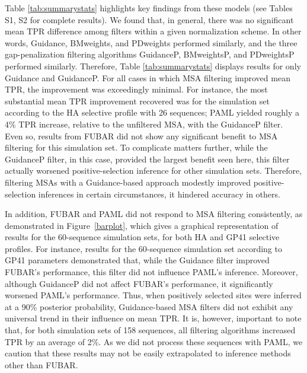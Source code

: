 \documentclass[11pt]{article}
\begin{document}
Table \ref{tab:summarystats} highlights key findings from these models (see Tables S1, S2 for complete results). We found that, in general, there was no significant mean TPR difference among filters within a given normalization scheme. In other words, Guidance, BMweights, and PDweights  performed similarly, and the three gap-penalization filtering algorithms GuidanceP, BMweightsP, and PDweightsP performed similarly. Therefore, Table \ref{tab:summarystats} displays results for only Guidance and GuidanceP. For all cases in which MSA filtering improved mean TPR, the improvement was exceedingly minimal. For instance, the most substantial mean TPR improvement recovered was for the simulation set according to the HA selective profile with 26 sequences; PAML yielded roughly a 4\% TPR increase, relative to the unfiltered MSA, with the GuidanceP filter. Even so, results from FUBAR did not show any significant benefit to MSA filtering for this simulation set. To complicate matters further, while the GuidanceP filter, in this case, provided the largest benefit seen here, this filter actually worsened positive-selection inference for other simulation sets. Therefore, filtering MSAs with a Guidance-based approach modestly improved positive-selection inferences in certain circumstances, it hindered accuracy in others.

In addition, FUBAR and PAML did not respond to MSA filtering consistently, as demonstrated in Figure~\ref{barplot}, which gives a graphical representation of results for the 60-sequence simulation sets, for both HA and GP41 selective profiles. For instance, results for the 60-sequence simulation set according to GP41 parameters demonstrated that, while the Guidance filter improved FUBAR's performance, this filter did not influence PAML's inference. Moreover, although GuidanceP did not affect FUBAR's performance, it significantly worsened PAML's performance. Thus, when positively selected sites were inferred at a 90\% posterior probability, Guidance-based MSA filters did not exhibit any universal trend in their influence on mean TPR. It is, however, important to note that, for both simulation sets of 158 sequences, all filtering algorithms increased TPR by an average of 2\%. As we did not process these sequences with PAML, we caution that these results may not be easily extrapolated to inference methods other than FUBAR.
\end{document}
